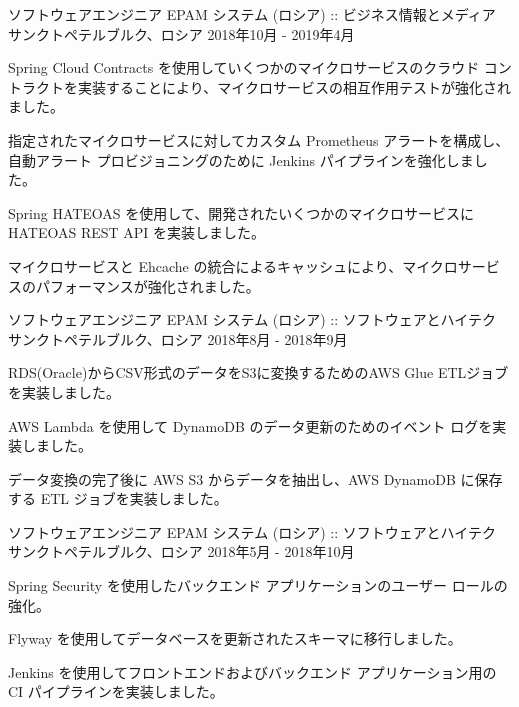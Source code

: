 \begin{cventries}
\cventry
{ソフトウェアエンジニア} %
{EPAM システム (ロシア) :: ビジネス情報とメディア} %
{サンクトペテルブルク、ロシア} %
{2018年10月 - 2019年4月} %
{
  \begin{cvitems} %
    \item {Spring Cloud Contracts を使用していくつかのマイクロサービスのクラウド コントラクトを実装することにより、マイクロサービスの相互作用テストが強化されました。}
    \item {指定されたマイクロサービスに対してカスタム Prometheus アラートを構成し、自動アラート プロビジョニングのために Jenkins パイプラインを強化しました。}
    \item {Spring HATEOAS を使用して、開発されたいくつかのマイクロサービスに HATEOAS REST API を実装しました。}
    \item {マイクロサービスと Ehcache の統合によるキャッシュにより、マイクロサービスのパフォーマンスが強化されました。}
  \end{cvitems}
}

\cventry
{ソフトウェアエンジニア} %
{EPAM システム (ロシア) :: ソフトウェアとハイテク} %
{サンクトペテルブルク、ロシア} %
{2018年8月 - 2018年9月} %
{
  \begin{cvitems} %
    \item {RDS(Oracle)からCSV形式のデータをS3に変換するためのAWS Glue ETLジョブを実装しました。}
    \item {AWS Lambda を使用して DynamoDB のデータ更新のためのイベント ログを実装しました。}
    \item {データ変換の完了後に AWS S3 からデータを抽出し、AWS DynamoDB に保存する ETL ジョブを実装しました。}
  \end{cvitems}
}

\cventry
{ソフトウェアエンジニア} %
{EPAM システム (ロシア) :: ソフトウェアとハイテク} %
{サンクトペテルブルク、ロシア} %
{2018年5月 - 2018年10月} %
{
  \begin{cvitems} %
    \item {Spring Security を使用したバックエンド アプリケーションのユーザー ロールの強化。}
    \item {Flyway を使用してデータベースを更新されたスキーマに移行しました。}
    \item {Jenkins を使用してフロントエンドおよびバックエンド アプリケーション用の CI パイプラインを実装しました。}
  \end{cvitems}
}

\end{cventries}
